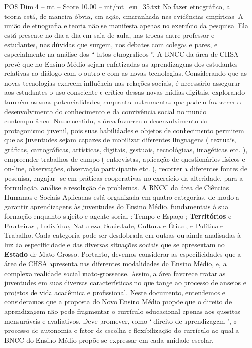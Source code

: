 \begin{textsample}{POS Dim 4 – mt – Score 10.00 – mt/mt\_em\_35.txt}
No fazer etnográfico, a teoria está, de maneira óbvia, em ação, emaranhada nas evidências empíricas.
A união de etnografia e teoria não se manifesta apenas no exercício da pesquisa.
Ela está presente no dia a dia em sala de aula, nas trocas entre professor e estudantes, nas dúvidas que surgem, nos debates com colegas e pares, e especialmente na análise dos “ fatos etnográficos ”.
A BNCC da área de CHSA prevê que no Ensino Médio sejam enfatizadas as aprendizagens dos estudantes relativas ao diálogo com o outro e com as novas tecnologias.
Considerando que as novas tecnologias exercem influência nas relações sociais, é necessário assegurar aos estudantes o uso consciente e crítico dessas novas mídias digitais, explorando também as suas potencialidades, enquanto instrumentos que podem favorecer o desenvolvimento do conhecimento e da convivência social no mundo contemporâneo.
Nesse sentido, a área favorece o desenvolvimento do protagonismo juvenil, pois suas habilidades e objetos de conhecimento permitem que as juventudes sejam capazes de mobilizar diferentes linguagens ( textuais, gráficas, cartográficas, artísticas, digitais, gestuais, tecnológicas, imagéticas etc. ), empreender trabalhos de campo ( entrevistas, aplicação de questionários físicos e on-line, observações, observação participante etc. ), recorrer a diferentes fontes de pesquisa, engajar -se em práticas cooperativas no exercício da alteridade, para a formulação, análise e resolução de problemas.
A BNCC da área de Ciências Humanas e Sociais Aplicadas está organizada em quatro categorias, de modo a garantir aprendizagens às juventudes do Ensino Médio, fundamentais à sua formação enquanto sujeito e agente social : Tempo e Espaço ; \textbf{Territórios} e Fronteiras ; Indivíduo, Natureza, Sociedade, Cultura e Ética ; e Política e Trabalho.
Cada categoria pode ser desdobrada em outras ou ainda analisadas à luz da especificidade e das diversas situações sociais que se apresentam no \textbf{Estado} de Mato Grosso.
Portanto, devemos considerar as especificidades que a área de CHSA apresenta nas diferentes modalidades do Ensino Médio, e, a complexa realidade social mato-grossense.
Assim, a área favorece tratar as juventudes em suas diversas características no que tange ao processo de anseios e projetos de vida acadêmica e profissional.
Neste documento, entendemos e consideramos que a proposta do Novo Ensino Médio propõe que o direito de aprendizagem não pode fragmentar o currículo educacional apenas aos quesitos mensuráveis e avaliativos.
Deve promover, como ‘ direito de aprendizagem ’, o processo de autonomia e fator de escolha e flexibilização do currículo ao qual a BNCC do Ensino Médio propõe se expressar em cada unidade escolar.

\end{textsample}
